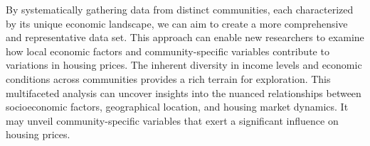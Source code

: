 \documentclass[12pt]{article}
\begin{document}
By systematically gathering data from distinct communities, each characterized by its unique economic landscape, we can aim to create a more comprehensive and representative data set. This approach can enable new researchers to examine how local economic factors and community-specific variables contribute to variations in housing prices. The inherent diversity in income levels and economic conditions across communities provides a rich terrain for exploration. This multifaceted analysis can uncover insights into the nuanced relationships between socioeconomic factors, geographical location, and housing market dynamics. It may unveil community-specific variables that exert a significant influence on housing prices.




\clearpage
\printbibliography[title={References}]
\end{document}
